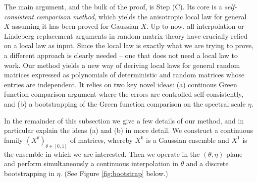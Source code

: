 \documentclass[11pt]{article} %
\numberwithin{equation}{section}
\numberwithin{figure}{section}
\theoremstyle{plain} %
\theoremstyle{definition} %
\begin{document}
The main argument, and the bulk of the proof, is Step (C). Its core is a \emph{self-consistent comparison method}, which yields the anisotropic local law for general $X$ assuming it has been proved for Gaussian $X$. Up to now, all interpolation or Lindeberg replacement arguments in random matrix theory have crucially relied on a local law as input. Since the local law is exactly what we are trying to prove, a different approach is clearly needed -- one that does not need a local law to work.
Our method yields a new way of deriving local laws for general random matrices expressed as polynomials of deterministic and random matrices whose entries are independent. It relies on two key novel ideas: (a) continous Green function comparison argument where the errors are controlled self-consistently, and (b) a bootstrapping of the Green function comparison on the spectral scale $\eta$.


In the remainder of this subsection we give a few details of our method, and in particular explain the ideas (a) and (b) in more detail. We construct a continuous family $(X^\theta)_{\theta \in [0,1]}$ of matrices, whereby $X^0$ is a Gaussian ensemble and $X^1$ is the ensemble in which we are interested.
Then we operate in the $(\theta, \eta)$-plane and perform simultaneously a continuous interpolation in $\theta$ and a discrete bootstrapping in $\eta$. (See Figure \ref{fig:bootstrap} below.)
\end{document}
